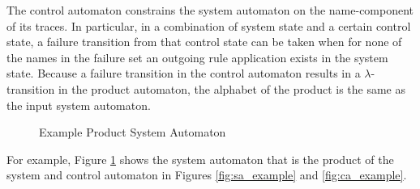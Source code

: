 The control automaton constrains the system automaton on the name-component of its traces. In particular, in a combination of system state and a certain control state, a failure transition from that control state can be taken when for none of the names in the failure set an outgoing rule application exists in the system state. Because a failure transition in the control automaton results in a $\lambda$-transition in the product automaton, the alphabet of the product is the same as the input system automaton.

\begin{figure}
\centering
{}
\caption{Example Product System Automaton}
\label{fig:prod_example}
\end{figure}

For example, Figure \ref{fig:prod_example} shows the system automaton that is the product of the system and control automaton in Figures \ref{fig:sa_example} and \ref{fig:ca_example}.
